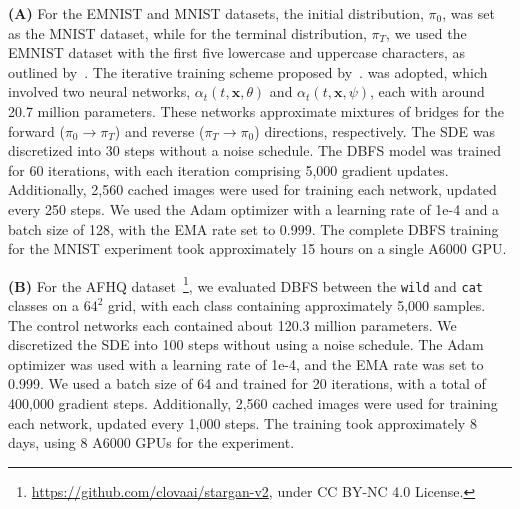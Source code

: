 \documentclass[nohyperref]{article}
\theoremstyle{plain}
\theoremstyle{remark}
\begin{document}
\textbf{(A)} For the EMNIST and MNIST datasets, the initial distribution, $\pi_0$, was set as the MNIST dataset, while for the terminal distribution, $\pi_T$, we used the EMNIST dataset with the first five lowercase and uppercase characters, as outlined by~\citep{de2021diffusion}. The iterative training scheme proposed by~\citep{peluchetti2023diffusion}. was adopted, which involved two neural networks, $\alpha_t(t, \mathbf{x}, \theta)$ and $\alpha_t(t, \mathbf{x}, \psi)$, each with around 20.7 million parameters. These networks approximate mixtures of bridges for the forward ($\pi_0 \to \pi_T$) and reverse ($\pi_T \to \pi_0$) directions, respectively. The SDE was discretized into 30 steps without a noise schedule. The DBFS model was trained for 60 iterations, with each iteration comprising 5,000 gradient updates. Additionally, 2,560 cached images were used for training each network, updated every 250 steps. We used the Adam optimizer with a learning rate of 1e-4 and a batch size of 128, with the EMA rate set to 0.999. The complete DBFS training for the MNIST experiment took approximately 15 hours on a single A6000 GPU.

\textbf{(B)} For the AFHQ dataset~\cite{choi2020starganv2}\footnote{\url{https://github.com/clovaai/stargan-v2}, under CC BY-NC 4.0 License. }, we evaluated DBFS between the \texttt{wild} and \texttt{cat} classes on a $64^2$ grid, with each class containing approximately 5,000 samples. The control networks each contained about 120.3 million parameters. We discretized the SDE into 100 steps without using a noise schedule. The Adam optimizer was used with a learning rate of 1e-4, and the EMA rate was set to 0.999. We used a batch size of 64 and trained for 20 iterations, with a total of 400,000 gradient steps. Additionally, 2,560 cached images were used for training each network, updated every 1,000 steps. The training took approximately 8 days, using 8 A6000 GPUs for the experiment.


\begin{table}[h!]
\caption{Network Hyper-parameters}
\label{table:training_hyperparameters}
\centering
\end{table}
\end{document}
